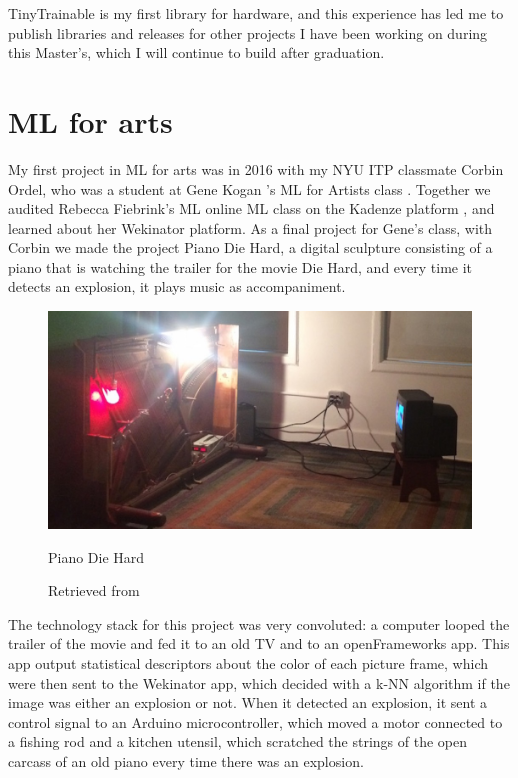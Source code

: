 TinyTrainable is my first library for hardware, and this experience has led me to publish libraries and releases for other projects I have been working on during this Master's, which I will continue to build after graduation.

\section{ML for arts}

My first project in \acrshort{ML} for arts was in 2016 with my \acrshort{NYU} \acrshort{ITP} classmate Corbin Ordel, who was a student at Gene Kogan \cite{website-gene-kogan}'s \acrshort{ML} for Artists class \cite{website-gene-kogan-machine-learning-for-artists}. Together we audited Rebecca Fiebrink\cite{website-rebecca-fiebrink}'s \acrshort{ML} online ML class on the Kadenze platform \cite{kadenze-ml-for-musicians-and-artists}, and learned about her Wekinator \cite{website-wekinator} platform. As a final project for Gene's class, with Corbin we made the project Piano Die Hard, a digital sculpture consisting of a piano that is watching the trailer for the movie Die Hard, and every time it detects an explosion, it plays music as accompaniment.

\begin{figure}[ht]
  \centering
  \includegraphics[width=0.80\linewidth,height=0.40\textheight,keepaspectratio]{images/piano-die-hard.jpg}
  \caption{Piano Die Hard}
  \caption*{Retrieved from \cite{website-alt-ai}}
  \label{fig:piano-die-hard}
\end{figure}

The technology stack for this project was very convoluted: a computer looped the trailer of the movie and fed it to an old TV and to an openFrameworks app. This app output statistical descriptors about the color of each picture frame, which were then sent to the Wekinator app, which decided with a \acrshort{k-NN} algorithm if the image was either an explosion or not. When it detected an explosion, it sent a control signal to an Arduino microcontroller, which moved a motor connected to a fishing rod and a kitchen utensil, which scratched the strings of the open carcass of an old piano every time there was an explosion.

